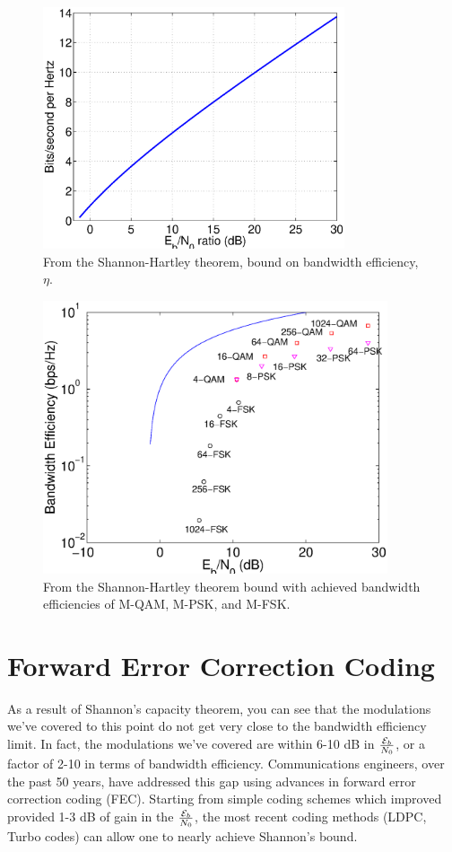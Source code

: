 \begin{figure}[htbp]
  \centerline{\includegraphics[width=3.5in]{../images/plotShannonEfficiencyBoundLinear.eps}}
  \caption{From the Shannon-Hartley theorem, bound on bandwidth efficiency, $\eta$.}
  \label{F:Bound-Bandwidth-Efficiency}
\end{figure}
\begin{figure}[htbp]
  \centerline{\includegraphics[width=4.0in]{../images/plotShannonWithModTypes.eps}}
  \caption{From the Shannon-Hartley theorem bound with achieved bandwidth efficiencies of M-QAM, M-PSK, and M-FSK.}
  \label{F:Bound-Bandwidth-Efficiency-2}
\end{figure}


\section{Forward Error Correction Coding}

As a result of Shannon's capacity theorem, you can see that the modulations we've covered to this point do not get very close to the bandwidth efficiency limit.  In fact, the  modulations we've covered are within 6-10 dB in $\frac{\mathcal{E}_b}{N_0}$, or a factor of 2-10 in terms of bandwidth efficiency.   Communications engineers, over the past 50 years, have addressed this gap using advances in forward error correction coding (FEC).  Starting from simple coding schemes which improved provided 1-3 dB of gain in the $\frac{\mathcal{E}_b}{N_0}$, the most recent coding methods (LDPC, Turbo codes) can allow one to nearly achieve Shannon's bound.  

